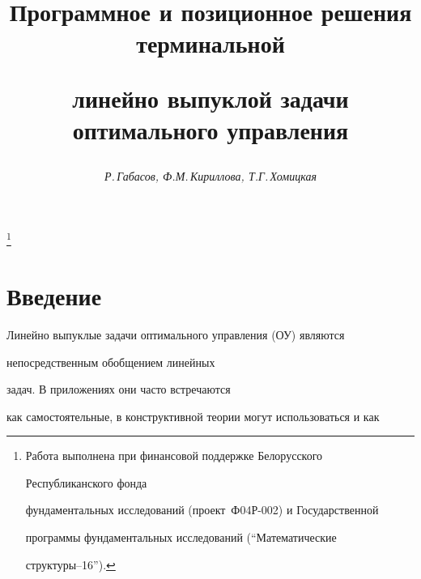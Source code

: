 






\author{\it Р.\,Габасов, Ф.М.\,Кириллова, Т.Г.\,Хомицкая}




\title{Программное и позиционное решения терминальной


линейно выпуклой задачи оптимального управления}


\thanks{Работа выполнена при финансовой поддержке Белорусского


Республиканского фонда


фундаментальных исследований (проект \No\,Ф04Р-002) и Государственной


программы фундаментальных исследований (``Математические


структуры--16'').}





\date{}




\pagestyle{plain} %







\maketitle


\label{begin}











\section{Введение}





Линейно выпуклые задачи оптимального управления (ОУ) являются 


непосредственным обобщением линейных


задач. В приложениях они часто встречаются


как самостоятельные, в конструктивной теории могут использоваться и как


